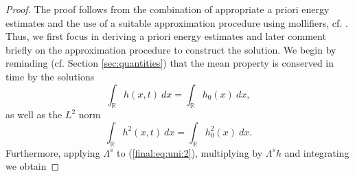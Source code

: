 \documentclass[final,11pt,a4paper,reqno]{amsart}
\newcommand{\RR}{\mathbb R}
\theoremstyle{definition}
\begin{document}
\begin{proof}
The proof follows from the combination of appropriate a priori energy estimates and the use of a suitable approximation procedure using mollifiers, cf. \cite{Majda-Bertozzi-2001}. Thus, we first focus in deriving a priori energy estimates and later comment briefly on the approximation procedure to construct the solution. We begin by reminding (cf. Section \ref{sec:quantities}) that the mean property is conserved in time by the solutions
\[ \int_{\RR} h(x,t) \ dx=\int_{\RR} h_0(x) \ dx, \]
as well as the $L^{2}$ norm
\begin{equation*}
 \int_{\RR} h^{2}(x,t) \ dx=\int_{\RR} h^{2}_0(x) \ dx.
 \end{equation*}
Furthermore, applying $\Lambda^{s}$ to (\ref{final:eq:uni:2}), multiplying by $\Lambda^{s}h$ and integrating we obtain




\end{proof}
\end{document}
